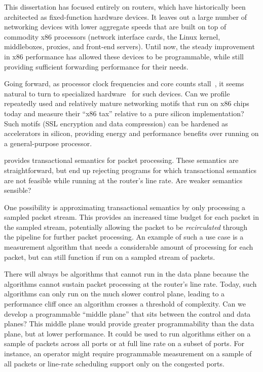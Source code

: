  This dissertation has focused entirely on
routers, which have historically been architected as fixed-function hardware
devices. It leaves out a large number of networking devices with lower
aggregate speeds that are built on top of commodity x86 processors (\eg network
interface cards, the Linux kernel, middleboxes, proxies, and front-end
servers). Until now, the steady improvement in x86 performance has allowed
these devices to be programmable, while still providing sufficient forwarding
performance for their needs.

Going forward, as processor clock frequencies and core counts stall~\cite{dark_silicon}, it seems
natural to turn to specialized hardware~\cite{four_horsemen} for
such devices. Can we profile repeatedly used and relatively mature networking
motifs that run on x86 chips today and measure their ``x86 tax'' relative to a
pure silicon implementation? Such motifs (\eg SSL encryption and data
compression) can be hardened as accelerators in silicon, providing energy and
performance benefits over running on a general-purpose processor.

 \pktlanguage provides
transactional semantics for packet processing. These semantics are
straightforward, but end up rejecting programs for which transactional
semantics are not feasible while running at the router's line rate.  Are weaker
semantics sensible?

One possibility is approximating transactional semantics by only processing a
sampled packet stream.  This provides an increased time budget for each packet
in the sampled stream, potentially allowing the packet to be {\em recirculated}
through the pipeline for further packet processing. An example of such a use
case is a measurement algorithm that needs a considerable amount of processing
for each packet, but can still function if run on a sampled stream of packets.

 There will always be algorithms that
cannot run in the data plane because the algorithms cannot sustain packet
processing at the router's line rate. Today, such algorithms can only run on
the much slower control plane, leading to a performance cliff once an algorithm
crosses a threshold of complexity. Can we develop a programmable ``middle
plane'' that sits between the control and data planes? This middle plane would
provide greater programmability than the data plane, but at lower performance.
It could be used to run algorithms either on a sample of packets across all
ports or at full line rate on a subset of ports. For instance, an operator
might require programmable measurement on a sample of all packets or line-rate
scheduling support only on the congested ports.

